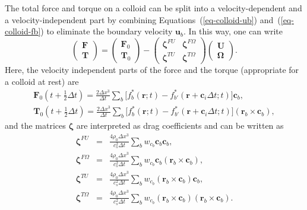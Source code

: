 The total force and torque on a colloid can be split into a velocity-dependent
and a velocity-independent part by combining Equations~(\ref{eq-colloid-ub})
and~(\ref{eq-colloid-fb}) to eliminate the boundary velocity $\mathbf{u}_b$.
In this way, one can write
\begin{equation}
\left( \begin{array}{rr} \mathbf{F} \\ \mathbf{T}
\end{array} \right) =
\left( \begin{array}{rr} \mathbf{F}_0 \\ \mathbf{T}_0
\end{array} \right) -
\left( \begin{array}{rr}
\mathbf{\boldsymbol{\zeta}}^{FU} & \mathbf{\boldsymbol{\zeta}}^{F\Omega} \\
\mathbf{\boldsymbol{\zeta}}^{TU} & \mathbf{\boldsymbol{\zeta}}^{T\Omega}
\end{array} \right)
\left( \begin{array}{rr} \mathbf{U} \\ \mathbf{\Omega}
\end{array} \right).
\end{equation}
Here, the velocity independent parts of the force and the torque
(appropriate for a colloid at rest) are
\begin{eqnarray}
\mathbf{F}_0(t + {\scriptstyle\frac{1}{2}}\Delta t) =
\frac{2\Delta x^3}{\Delta t} \sum_b \big[ f_b^\ast(\mathbf{r}; t)
- f_{b'}^\ast(\mathbf{r} + \mathbf{c}_i \Delta t; t) \big] \mathbf{c}_b,
\\
\mathbf{T}_0(t + {\scriptstyle\frac{1}{2}}\Delta t) =
\frac{2\Delta x^3}{\Delta t} \sum_b \big[ f_b^\ast(\mathbf{r}; t)
- f_{b'}^\ast(\mathbf{r} + \mathbf{c}_i \Delta t; t) \big]
(\mathbf{r}_b\times \mathbf{c}_b),
\end{eqnarray}
and the matrices $\boldsymbol{\zeta}$ are interpreted as drag
coefficients and can be written as
\begin{eqnarray}
\mathbf{\boldsymbol{\zeta}}^{FU} &=& \frac{4\rho_0 \Delta x^3}{c_s^2 \Delta t}
\sum_b w_{c_b} \mathbf{c}_b \mathbf{c}_b,
\\
\mathbf{\boldsymbol{\zeta}}^{F\Omega} &=&
\frac{4\rho_0 \Delta x^3}{c_s^2 \Delta t}
\sum_b w_{c_b} \mathbf{c}_b (\mathbf{r}_b \times \mathbf{c}_b),
\\
\mathbf{\boldsymbol{\zeta}}^{TU} &=& \frac{4\rho_0 \Delta x^3}{c_s^2 \Delta t}
\sum_b w_{c_b} (\mathbf{r}_b \times \mathbf{c}_b) \mathbf{c}_b,
\\
\mathbf{\boldsymbol{\zeta}}^{T\Omega} &=&
\frac{4\rho_0 \Delta x^3}{c_s^2 \Delta t}
\sum_b w_{c_b} (\mathbf{r}_b \times \mathbf{c}_b)
(\mathbf{r}_b \times \mathbf{c}_b).
\end{eqnarray}

